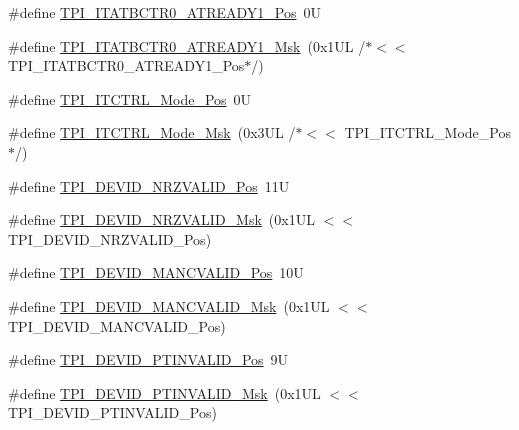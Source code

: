 \begin{DoxyCompactItemize}
\item 
\#define \mbox{\hyperlink{group___c_m_s_i_s___t_p_i_gaded82241155665db59493d912d44c65c}{T\+P\+I\+\_\+\+I\+T\+A\+T\+B\+C\+T\+R0\+\_\+\+A\+T\+R\+E\+A\+D\+Y1\+\_\+\+Pos}}~0U
\item 
\#define \mbox{\hyperlink{group___c_m_s_i_s___t_p_i_ga21e1f9c5532e75ee2edc8eb4cf69b1f0}{T\+P\+I\+\_\+\+I\+T\+A\+T\+B\+C\+T\+R0\+\_\+\+A\+T\+R\+E\+A\+D\+Y1\+\_\+\+Msk}}~(0x1\+U\+L /$\ast$$<$$<$ T\+P\+I\+\_\+\+I\+T\+A\+T\+B\+C\+T\+R0\+\_\+\+A\+T\+R\+E\+A\+D\+Y1\+\_\+\+Pos$\ast$/)
\item 
\#define \mbox{\hyperlink{group___c_m_s_i_s___t_p_i_gaa847adb71a1bc811d2e3190528f495f0}{T\+P\+I\+\_\+\+I\+T\+C\+T\+R\+L\+\_\+\+Mode\+\_\+\+Pos}}~0U
\item 
\#define \mbox{\hyperlink{group___c_m_s_i_s___t_p_i_gad6f87550b468ad0920d5f405bfd3f017}{T\+P\+I\+\_\+\+I\+T\+C\+T\+R\+L\+\_\+\+Mode\+\_\+\+Msk}}~(0x3\+U\+L /$\ast$$<$$<$ T\+P\+I\+\_\+\+I\+T\+C\+T\+R\+L\+\_\+\+Mode\+\_\+\+Pos$\ast$/)
\item 
\#define \mbox{\hyperlink{group___c_m_s_i_s___t_p_i_ga9f46cf1a1708575f56d6b827766277f4}{T\+P\+I\+\_\+\+D\+E\+V\+I\+D\+\_\+\+N\+R\+Z\+V\+A\+L\+I\+D\+\_\+\+Pos}}~11U
\item 
\#define \mbox{\hyperlink{group___c_m_s_i_s___t_p_i_gacecc8710a8f6a23a7d1d4f5674daf02a}{T\+P\+I\+\_\+\+D\+E\+V\+I\+D\+\_\+\+N\+R\+Z\+V\+A\+L\+I\+D\+\_\+\+Msk}}~(0x1\+U\+L $<$$<$ T\+P\+I\+\_\+\+D\+E\+V\+I\+D\+\_\+\+N\+R\+Z\+V\+A\+L\+I\+D\+\_\+\+Pos)
\item 
\#define \mbox{\hyperlink{group___c_m_s_i_s___t_p_i_ga675534579d9e25477bb38970e3ef973c}{T\+P\+I\+\_\+\+D\+E\+V\+I\+D\+\_\+\+M\+A\+N\+C\+V\+A\+L\+I\+D\+\_\+\+Pos}}~10U
\item 
\#define \mbox{\hyperlink{group___c_m_s_i_s___t_p_i_ga4c3ee4b1a34ad1960a6b2d6e7e0ff942}{T\+P\+I\+\_\+\+D\+E\+V\+I\+D\+\_\+\+M\+A\+N\+C\+V\+A\+L\+I\+D\+\_\+\+Msk}}~(0x1\+U\+L $<$$<$ T\+P\+I\+\_\+\+D\+E\+V\+I\+D\+\_\+\+M\+A\+N\+C\+V\+A\+L\+I\+D\+\_\+\+Pos)
\item 
\#define \mbox{\hyperlink{group___c_m_s_i_s___t_p_i_ga974cccf4c958b4a45cb71c7b5de39b7b}{T\+P\+I\+\_\+\+D\+E\+V\+I\+D\+\_\+\+P\+T\+I\+N\+V\+A\+L\+I\+D\+\_\+\+Pos}}~9U
\item 
\#define \mbox{\hyperlink{group___c_m_s_i_s___t_p_i_ga1ca84d62243e475836bba02516ba6b97}{T\+P\+I\+\_\+\+D\+E\+V\+I\+D\+\_\+\+P\+T\+I\+N\+V\+A\+L\+I\+D\+\_\+\+Msk}}~(0x1\+U\+L $<$$<$ T\+P\+I\+\_\+\+D\+E\+V\+I\+D\+\_\+\+P\+T\+I\+N\+V\+A\+L\+I\+D\+\_\+\+Pos)
\item 
$$
\end{DoxyCompactItemize}
